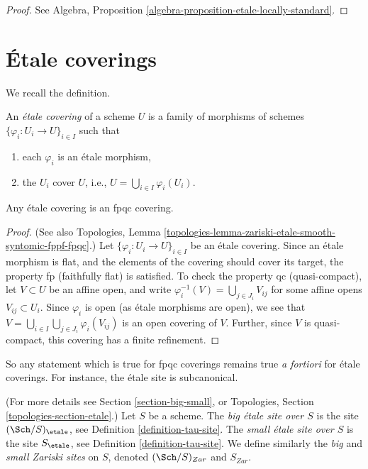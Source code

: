\begin{proof}
See
Algebra, Proposition \ref{algebra-proposition-etale-locally-standard}.
\end{proof}





\section{\'Etale coverings}
\label{section-etale-covering}

\noindent
We recall the definition.

\begin{definition}
\label{definition-etale-covering}
An {\it \'etale covering} of a scheme $U$ is a family of morphisms
of schemes
$\{\varphi_i : U_i \to U\}_{i \in I}$ such that
\begin{enumerate}
\item each $\varphi_i$ is an \'etale morphism,
\item the $U_i$ cover $U$, i.e., $U = \bigcup_{i\in I}\varphi_i(U_i)$.
\end{enumerate}
\end{definition}

\begin{lemma}
\label{lemma-etale-fpqc}
Any \'etale covering is an fpqc covering.
\end{lemma}

\begin{proof}
(See also
Topologies,
Lemma \ref{topologies-lemma-zariski-etale-smooth-syntomic-fppf-fpqc}.)
Let $\{\varphi_i : U_i \to U\}_{i \in I}$ be an \'etale covering.
Since an \'etale morphism is flat, and the elements of the covering should
cover its target, the property fp (faithfully flat) is satisfied.
To check the property qc (quasi-compact), let $V \subset U$ be an affine
open, and write $\varphi_i^{-1}(V) = \bigcup_{j \in J_i} V_{ij}$
for some affine opens $V_{ij} \subset U_i$. Since $\varphi_i$ is open
(as \'etale morphisms are open), we see that
$V = \bigcup_{i\in I} \bigcup_{j \in J_i} \varphi_i(V_{ij})$
is an open covering of $V$.
Further, since $V$ is quasi-compact, this covering has a finite
refinement.
\end{proof}

\noindent
So any statement which is true for fpqc coverings
remains true {\it a fortiori} for \'etale coverings. For
instance, the \'etale site is subcanonical.

\begin{definition}
\label{definition-big-etale-site}
(For more details see Section \ref{section-big-small}, or
Topologies, Section \ref{topologies-section-etale}.)
Let $S$ be a scheme.
The {\it big \'etale site over $S$} is the site
$(\Sch/S)_\etale$, see
Definition \ref{definition-tau-site}.
The {\it small \'etale site over $S$} is the site $S_\etale$, see
Definition \ref{definition-tau-site}.
We define similarly the {\it big} and {\it small Zariski sites} on $S$,
denoted $(\Sch/S)_{Zar}$ and $S_{Zar}$.
\end{definition}

